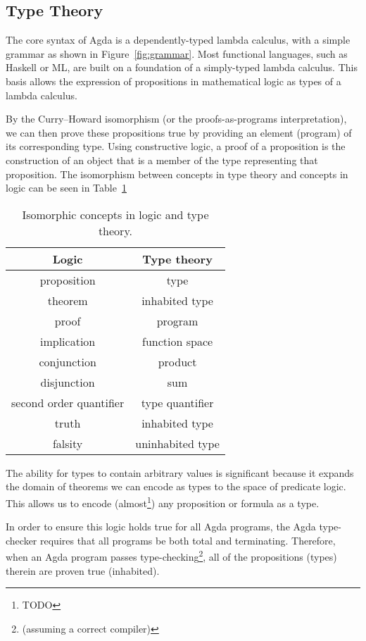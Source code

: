 

\subsection{Type Theory}
The core syntax of Agda is a dependently-typed lambda calculus, with a simple grammar as shown in Figure~\ref{fig:grammar}. Most functional languages, such as Haskell or ML, are built on a foundation of a simply-typed lambda calculus. This basis allows the expression of propositions in mathematical logic as types of a lambda calculus.

By the Curry–Howard isomorphism (or the proofs-as-programs interpretation), we can then prove these propositions true by providing an element (program) of its corresponding type.\cite{poernomo2005} Using constructive logic, a proof of a proposition is the construction of an object that is a member of the type representing that proposition. The isomorphism between concepts in type theory and concepts in logic can be seen in Table~\ref{table:curry_howard}

\begin{table}
\begin{center}
\begin{tabular}{c|c}
Logic & Type theory \\
\hline
proposition & type\\
theorem & inhabited type\\
proof & program\\
implication & function space\\
conjunction & product\\
disjunction & sum\\
second order quantifier & type quantifier\\
truth & inhabited type\\
falsity & uninhabited type\\
\end{tabular}
\end{center}
\caption{Isomorphic concepts in logic and type theory.}
\label{table:curry_howard}
\end{table}

The ability for types to contain arbitrary values is significant because it expands the domain of theorems we can encode as types to the space of predicate logic. This allows us to encode (almost\footnote{TODO}) any proposition or formula as a type.

 In order to ensure this logic holds true for all Agda programs, the Agda type-checker requires that all programs be both total and terminating.\cite{norell2009} Therefore, when an Agda program passes type-checking\footnote{(assuming a correct compiler)}, all of the propositions (types) therein are proven true (inhabited).

